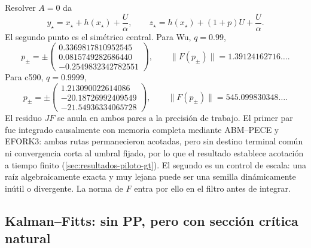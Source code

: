 Resolver $A=0$ da
\begin{equation}
 y_\star=x_\star+h(x_\star)+\frac{U}{\alpha},
 \qquad
 z_\star=h(x_\star)+(1+p)U+\frac{U}{\alpha}.
 \label{casegt:eq:arctan-yz}
\end{equation}
El segundo punto es el simétrico central. Para Wu, $q=0.99$,
\begin{equation}
 p_\pm=\pm
 \begin{pmatrix}
 0.3369817810952545\\
 0.0815749282686440\\
 -0.2549832342782551
 \end{pmatrix},
 \qquad \lVert F(p_\pm)\rVert=1.39124162716\ldots.
 \label{casegt:eq:wu-pp}
\end{equation}
Para c590, $q=0.9999$,
\begin{equation}
 p_\pm=\pm
 \begin{pmatrix}
 1.213090022614086\\
 -20.18726992409549\\
 -21.54936334065728
 \end{pmatrix},
 \qquad \lVert F(p_\pm)\rVert=545.099830348\ldots.
 \label{casegt:eq:c590-pp}
\end{equation}
El residuo $JF$ se anula en ambos pares a la precisión de trabajo. El primer par fue
integrado causalmente con memoria completa mediante ABM--PECE y EFORK3: ambas
rutas permanecieron acotadas, pero sin destino terminal común ni convergencia
corta al umbral fijado, por lo que el resultado establece acotación a tiempo finito
(\cref{sec:resultados-piloto-gt}). El segundo es un control
de escala: una raíz algebraicamente exacta y muy lejana puede ser una semilla
dinámicamente inútil o divergente. La norma de $F$ entra por ello en el filtro
antes de integrar.

\subsection{Kalman--Fitts: sin PP, pero con sección crítica natural}
\label{subsec:casegt-kalman}

